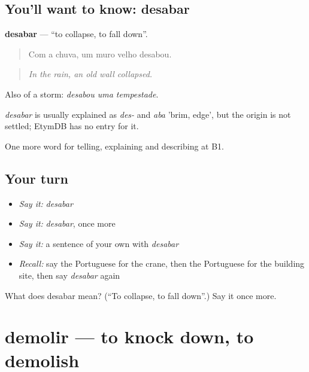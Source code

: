 \subsection*{You'll want to know: desabar}
\textbf{desabar} — \textquotedblleft{}to collapse, to fall down\textquotedblright{}.

\begin{quote}
Com a chuva, um muro velho desabou.
\end{quote}

\begin{quote}
\emph{In the rain, an old wall collapsed.}
\end{quote}

Also of a storm: \emph{desabou uma tempestade}.

\begin{cousinweb}
\emph{desabar} is usually explained as \emph{des-} and \emph{aba} 'brim, edge', but the origin is not settled; EtymDB has no entry for it.
\end{cousinweb}

\begin{grammarlens}[title={What you've built}]
One more word for telling, explaining and describing at B1.
\end{grammarlens}

\subsection*{Your turn}
\begin{itemize}
\raggedright
  \item \emph{Say it:} \emph{desabar}
  \item \emph{Say it:} \emph{desabar}, once more
  \item \emph{Say it:} a sentence of your own with \emph{desabar}
  \item \emph{Recall:} say the Portuguese for the crane, then the Portuguese for the building site, then say \emph{desabar} again
\end{itemize}

\begin{tcolorbox}[breakable,colback=teal!4,colframe=teal!35!black,title={Before you move on}]
What does desabar mean? (\textquotedblleft{}To collapse, to fall down\textquotedblright{}.) Say it once more.
\end{tcolorbox}
\section[demolir]{demolir — to knock down, to demolish}

